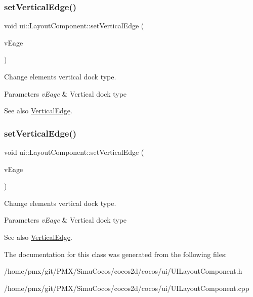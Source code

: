 \subsubsection{\texorpdfstring{set\+Vertical\+Edge()}{setVerticalEdge()}\hspace{0.1cm}{\footnotesize\ttfamily [1/2]}}
{\footnotesize\ttfamily void ui\+::\+Layout\+Component\+::set\+Vertical\+Edge (\begin{DoxyParamCaption}\item[{\hyperlink{classui_1_1LayoutComponent_a186978dac32f26bf251942e893999c8f}{Vertical\+Edge}}]{v\+Eage }\end{DoxyParamCaption})}

Change element\textquotesingle{}s vertical dock type. 
\begin{DoxyParams}{Parameters}
{\em v\+Eage} & Vertical dock type \\
\hline
\end{DoxyParams}
\begin{DoxySeeAlso}{See also}
{\ttfamily \hyperlink{classui_1_1LayoutComponent_a186978dac32f26bf251942e893999c8f}{Vertical\+Edge}}. 
\end{DoxySeeAlso}
\mbox{\label{classui_1_1LayoutComponent_a3fa4ab390686d8cab0ee1f3d1ff56e86}} 
\subsubsection{\texorpdfstring{set\+Vertical\+Edge()}{setVerticalEdge()}\hspace{0.1cm}{\footnotesize\ttfamily [2/2]}}
{\footnotesize\ttfamily void ui\+::\+Layout\+Component\+::set\+Vertical\+Edge (\begin{DoxyParamCaption}\item[{\hyperlink{classui_1_1LayoutComponent_a186978dac32f26bf251942e893999c8f}{Vertical\+Edge}}]{v\+Eage }\end{DoxyParamCaption})}

Change element\textquotesingle{}s vertical dock type. 
\begin{DoxyParams}{Parameters}
{\em v\+Eage} & Vertical dock type \\
\hline
\end{DoxyParams}
\begin{DoxySeeAlso}{See also}
{\ttfamily \hyperlink{classui_1_1LayoutComponent_a186978dac32f26bf251942e893999c8f}{Vertical\+Edge}}. 
\end{DoxySeeAlso}


The documentation for this class was generated from the following files\+:\begin{DoxyCompactItemize}
\item 
/home/pmx/git/\+P\+M\+X/\+Simu\+Cocos/cocos2d/cocos/ui/U\+I\+Layout\+Component.\+h\item 
/home/pmx/git/\+P\+M\+X/\+Simu\+Cocos/cocos2d/cocos/ui/U\+I\+Layout\+Component.\+cpp\end{DoxyCompactItemize}
